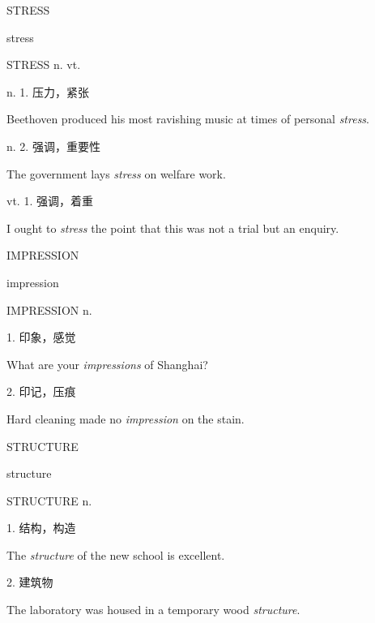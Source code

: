 \begin{flashcard}{
STRESS

stress
}
\begin{center}
STRESS n. vt. \textipa{[stres]}
\end{center}
n. 1. 压力，紧张

Beethoven produced his most ravishing music at times of personal \textit{stress}.

n. 2. 强调，重要性

The government lays \textit{stress} on welfare work.

vt. 1. 强调，着重

I ought to \textit{stress} the point that this was not a trial but an enquiry.

\end{flashcard}
\begin{flashcard}{
IMPRESSION

impression
}
\begin{center}
IMPRESSION n. 
\end{center}
1. 印象，感觉

What are your \textit{impressions} of Shanghai?

2. 印记，压痕

Hard cleaning made no \textit{impression} on the stain.

\end{flashcard}
\begin{flashcard}{
STRUCTURE

structure
}
\begin{center}
STRUCTURE n. 
\end{center}
1. 结构，构造

The \textit{structure} of the new school is excellent.

2. 建筑物

The laboratory was housed in a temporary wood \textit{structure}.

\end{flashcard}
